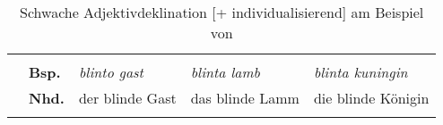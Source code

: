\begin{table}
{\begin{tabular}{lllll}
                  &               & \multicolumn{1}{l}{}                     & \multicolumn{1}{l}{}                     & \multicolumn{1}{l}{}                         \\
                  & \textbf{Bsp.} & \multicolumn{1}{l}{\textit{blinto gast}} & \multicolumn{1}{l}{\textit{blinta lamb}} & \multicolumn{1}{l}{\textit{blinta kuningin}} \\
                  & \textbf{Nhd.}          & \multicolumn{1}{l}{der blinde Gast}      & \multicolumn{1}{l}{das blinde Lamm}      & \multicolumn{1}{l}{die blinde Königin}       \\ \lspbottomrule
\end{tabular}}
\caption{Schwache Adjektivdeklination [+ individualisierend] am Beispiel von   \parencite[226]{Braune2004}}
\label{tab:schwach-adj}
\end{table}

